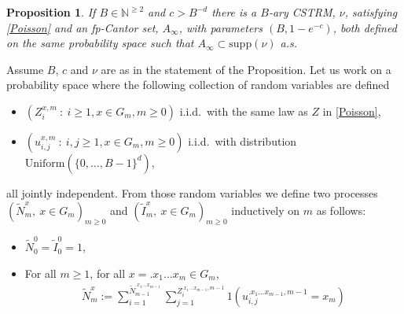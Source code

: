\documentclass[12pt]{article}
\makeatletter
\renewenvironment{proof}[1][\proofname]{%
\par\pushQED{\qed}\normalfont%
\topsep6\p@\@plus6\p@\relax
\trivlist\item[\hskip\labelsep\bfseries#1\@addpunct{.}]%
\ignorespaces
}{%
\popQED\endtrivlist\@endpefalse
}
\newtheorem{proposition}[theorem]{Proposition}
\numberwithin{theorem}{section}
\theoremstyle{def}
\numberwithin{equation}{section}
\newcommand{\N}{\mathbb{N}}
\newcommand{\supp}{\mathrm{supp}}
\makeatother
\begin{document}
\begin{proposition}\label{prop:Anucoupling} If $B\in \N^{\ge 2}$ and $c>B^{-d}$ there is a $B$-ary CSTRM, $\nu$, satisfying \eqref{Poisson} and an fp-Cantor set, $A_\infty$, with parameters $(B,1-e^{-c})$, both defined on the same probability space such that $A_\infty\subset\supp(\nu)$ a.s.
\end{proposition}
\begin{proof}
Assume $B$, $c$ and $\nu$ are as in the statement of the Proposition. 
Let us work on a probability space where the following collection of random variables are defined 
\begin{itemize}
	\item $(Z_i^{x,m} \ : \ i\geq 1, x \in G_m, m\geq 0)$ i.i.d.\ with the same law as $Z$ in \eqref{Poisson},
	\item $(u_{i,j}^{x,m}\ : \ i,j\geq 1, x \in G_m, m\geq 0)$ i.i.d.\ with distribution $\mathrm{Uniform}(\{0,\dots, B-1\}^d)$,
\end{itemize}
all jointly independent.
From those random variables we define two processes $(\widetilde{N}_m^x, \ x\in G_m)_{m\geq 0}$ and $(\widetilde{I}_m^x, \ x\in G_m)_{m\geq 0}$ inductively on $m$ as follows:
\begin{itemize}
	\item $\widetilde{N}_0^0=\widetilde{I}_0^0=1$,
	\item For all $m\geq 1$, for all $x=.x_1\dots x_{m}\in G_{m}$,
		\begin{align*}
		\widetilde{N}_m^x:=\sum_{i=1}^{\widetilde{N}_{m-1}^{.x_1\dots x_{m-1}}}\sum_{j=1}^{Z_i^{.x_1\dots x_{m-1},m-1}} 1(u_{i,j}^{.x_1\dots x_{m-1},m-1}= x_m)
	\end{align*} 

\end{itemize}
\end{proof}
\end{document}
